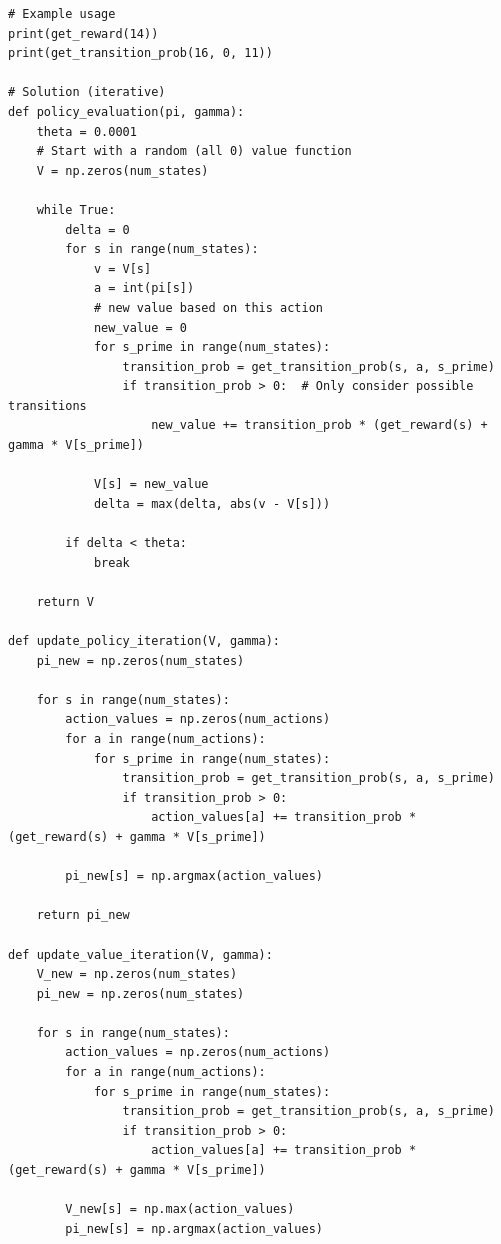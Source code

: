 \documentclass[submit]{../harvardml}
\begin{document}
\lstset{style=pythonstyle}

\begin{lstlisting}
# Example usage
print(get_reward(14))
print(get_transition_prob(16, 0, 11))

# Solution (iterative)
def policy_evaluation(pi, gamma):
    theta = 0.0001
    # Start with a random (all 0) value function
    V = np.zeros(num_states)

    while True:
        delta = 0
        for s in range(num_states):
            v = V[s]
            a = int(pi[s])
            # new value based on this action
            new_value = 0
            for s_prime in range(num_states):
                transition_prob = get_transition_prob(s, a, s_prime)
                if transition_prob > 0:  # Only consider possible transitions
                    new_value += transition_prob * (get_reward(s) + gamma * V[s_prime])
            
            V[s] = new_value
            delta = max(delta, abs(v - V[s]))
        
        if delta < theta:
            break
    
    return V

def update_policy_iteration(V, gamma):
    pi_new = np.zeros(num_states)
    
    for s in range(num_states):
        action_values = np.zeros(num_actions)
        for a in range(num_actions):
            for s_prime in range(num_states):
                transition_prob = get_transition_prob(s, a, s_prime)
                if transition_prob > 0: 
                    action_values[a] += transition_prob * (get_reward(s) + gamma * V[s_prime])
        
        pi_new[s] = np.argmax(action_values)
    
    return pi_new

def update_value_iteration(V, gamma):
    V_new = np.zeros(num_states)
    pi_new = np.zeros(num_states)

    for s in range(num_states):
        action_values = np.zeros(num_actions)
        for a in range(num_actions):
            for s_prime in range(num_states):
                transition_prob = get_transition_prob(s, a, s_prime)
                if transition_prob > 0: 
                    action_values[a] += transition_prob * (get_reward(s) + gamma * V[s_prime])
        
        V_new[s] = np.max(action_values)
        pi_new[s] = np.argmax(action_values)
    

\end{lstlisting}
\end{document}
